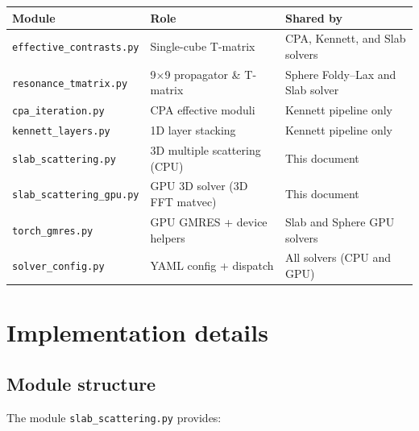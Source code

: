 \documentclass[11pt,a4paper]{article}
\begin{document}
\begin{center}
\renewcommand{\arraystretch}{1.3}
\begin{tabular}{llp{7.5cm}}
\toprule
\textbf{Module} & \textbf{Role} & \textbf{Shared by} \\
\midrule
\texttt{effective\_contrasts.py} &
  Single-cube T-matrix &
  CPA, Kennett, and Slab solvers \\
\texttt{resonance\_tmatrix.py} &
  9$\times$9 propagator \& T-matrix &
  Sphere Foldy--Lax and Slab solver \\
\texttt{cpa\_iteration.py} &
  CPA effective moduli &
  Kennett pipeline only \\
\texttt{kennett\_layers.py} &
  1D layer stacking &
  Kennett pipeline only \\
\texttt{slab\_scattering.py} &
  3D multiple scattering (CPU) &
  This document \\
\texttt{slab\_scattering\_gpu.py} &
  GPU 3D solver (3D FFT matvec) &
  This document \\
\texttt{torch\_gmres.py} &
  GPU GMRES + device helpers &
  Slab and Sphere GPU solvers \\
\texttt{solver\_config.py} &
  YAML config + dispatch &
  All solvers (CPU and GPU) \\
\bottomrule
\end{tabular}
\end{center}

\section{Implementation details}
\label{sec:implementation}

\subsection{Module structure}

The module \texttt{slab\_scattering.py} provides:
\end{document}
